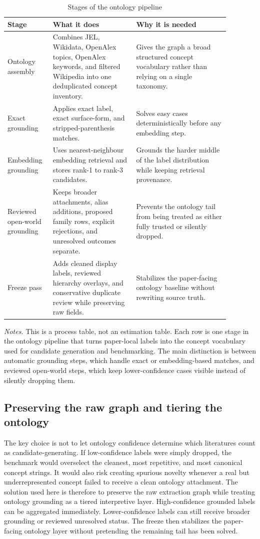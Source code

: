 \documentclass[11pt]{article}
\newcommand{\fignotes}[1]{\caption*{\textit{Notes.} #1}}
\begin{document}
\begin{table}[t]
  \caption{Stages of the ontology pipeline}
  \label{tab:mapping-stages}
  \centering
  \begin{tabular}{L{0.16\linewidth}L{0.34\linewidth}L{0.38\linewidth}}
    \toprule
    Stage & What it does & Why it is needed \\
    \midrule
    Ontology assembly & Combines JEL, Wikidata, OpenAlex topics, OpenAlex keywords, and filtered Wikipedia into one deduplicated concept inventory. & Gives the graph a broad structured concept vocabulary rather than relying on a single taxonomy. \\
    Exact grounding & Applies exact label, exact surface-form, and stripped-parenthesis matches. & Solves easy cases deterministically before any embedding step. \\
    Embedding grounding & Uses nearest-neighbour embedding retrieval and stores rank-1 to rank-3 candidates. & Grounds the harder middle of the label distribution while keeping retrieval provenance. \\
    Reviewed open-world grounding & Keeps broader attachments, alias additions, proposed family rows, explicit rejections, and unresolved outcomes separate. & Prevents the ontology tail from being treated as either fully trusted or silently dropped. \\
    Freeze pass & Adds cleaned display labels, reviewed hierarchy overlays, and conservative duplicate review while preserving raw fields. & Stabilizes the paper-facing ontology baseline without rewriting source truth. \\
    \bottomrule
  \end{tabular}
  \fignotes{This is a process table, not an estimation table. Each row is one stage in the ontology pipeline that turns paper-local labels into the concept vocabulary used for candidate generation and benchmarking. The main distinction is between automatic grounding steps, which handle exact or embedding-based matches, and reviewed open-world steps, which keep lower-confidence cases visible instead of silently dropping them.}
\end{table}

\subsection{Preserving the raw graph and tiering the ontology}

The key choice is not to let ontology confidence determine which literatures count as candidate-generating. If low-confidence labels were simply dropped, the benchmark would overselect the cleanest, most repetitive, and most canonical concept strings. It would also risk creating spurious novelty whenever a real but underrepresented concept failed to receive a clean ontology attachment. The solution used here is therefore to preserve the raw extraction graph while treating ontology grounding as a tiered interpretive layer. High-confidence grounded labels can be aggregated immediately. Lower-confidence labels can still receive broader grounding or reviewed unresolved status. The freeze then stabilizes the paper-facing ontology layer without pretending the remaining tail has been solved.
\end{document}
